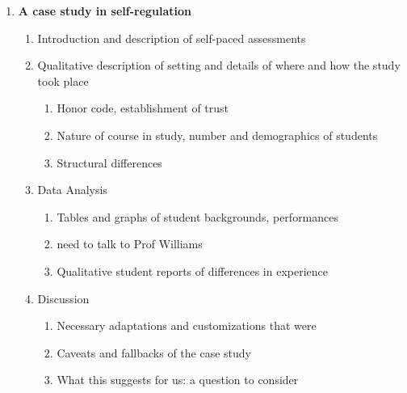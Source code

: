 \begin{enumerate}
\begin{enumerate}
    \end{enumerate}
    \item {\bf A case study in self-regulation}
    \begin{enumerate}
      \item Introduction and description of self-paced assessments
      \item Qualitative description of setting and details of where and how the study took place
      \begin{enumerate}
        \item Honor code, establishment of trust
        \item Nature of course in study, number and demographics of students
        \item Structural differences
      \end{enumerate}
      \item Data Analysis
      \begin{enumerate}
        \item Tables and graphs of student backgrounds, performances
        \item need to talk to Prof Williams
        \item Qualitative student reports of differences in experience
      \end{enumerate}
      \item Discussion
      \begin{enumerate}
        \item Necessary adaptations and customizations that were
        \item Caveats and fallbacks of the case study
        \item What this suggests for us: a question to consider
      \end{enumerate}
    \end{enumerate}
\end{enumerate}

